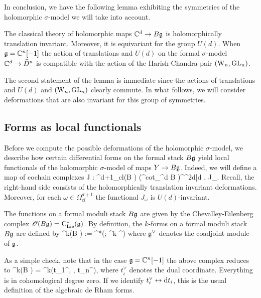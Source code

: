 \documentclass[10pt]{amsart}
\begin{document}
In conclusion, we have the following lemma exhibiting the symmetries of the holomorphic $\sigma$-model we will take into account.

\begin{lem}
The classical theory of holomorphic maps $\mathbb C^d \to B \mathfrak g$ is holomorphically translation invariant. 
Moreover, it is equivariant for the group $U(d)$. 
When $\mathfrak g = \mathbb C^n[-1]$ the action of translations and $U(d)$ on the formal $\sigma$-model $\mathbb C^d \to \widehat{D}^n$ is compatible with the action of the Harish-Chandra pair $({{\rm W}_n}, {\rm GL}_n)$. 
\end{lem}

The second statement of the lemma is immediate since the actions of translations and $U(d)$ and $({{\rm W}_n}, {\rm GL}_n)$ clearly commute.
In what follows, we will consider deformations that are also invariant for this group of symmetries. 

\subsection{Forms as local functionals} \label{sec: forms to local}

Before we compute the possible deformations of the holomorphic $\sigma$-model, we describe how certain differential forms on the formal stack $B \mathfrak g$ yield local functionals of the holomorphic $\sigma$-model of maps $Y \to B \mathfrak g$. 
Indeed, we will define a map of cochain complexes
\ben
J : \Omega^{d+1}_{cl}(B \fg) \to \left(\Def^{\rm cot}_{\CC^d \to B \fg}\right)^{\CC^{2d|d}} \;\;  , \;\; \omega \mapsto J_\omega .
\een
Recall, the right-hand side consists of the holomorphically translation invariant deformations.
Moreover, for each $\omega \in \Omega^{d+1}_{cl}$ the functional $J_\omega$ is $U(d)$-invariant. 

The functions on a formal moduli stack $B \mathfrak g$ are given by the Chevalley-Eilenberg complex $\mathscr O(B\mathfrak g) = {\rm C}_{{\rm Lie}}^*(\mathfrak g)$.
By definition, the $k$-forms on a formal moduli stack $B\mathfrak g$ are defined by
\ben
\Omega^k(B \fg) := \clie^*(\fg ; \Sym^k \fg^\vee [-k])
\een
where $\mathfrak g^\vee$ denotes the coadjoint module of $\mathfrak g$. 

As a simple check, note that in the case $\mathfrak g = \mathbb C^n [-1]$ the above complex reduces to
\ben
\Omega^k(B \fg) = \CC[t_1,\ldots, t_n] \tensor \wedge^k(t_1^\vee, \cdots, t_n^\vee),
\een
where $t_i^\vee$ denotes the dual coordinate. 
Everything is in cohomological degree zero.
If we identify $t_i^\vee \leftrightarrow {\rm d} t_i$, this is the usual definition of the algebraic de Rham forms. 
\end{document}

